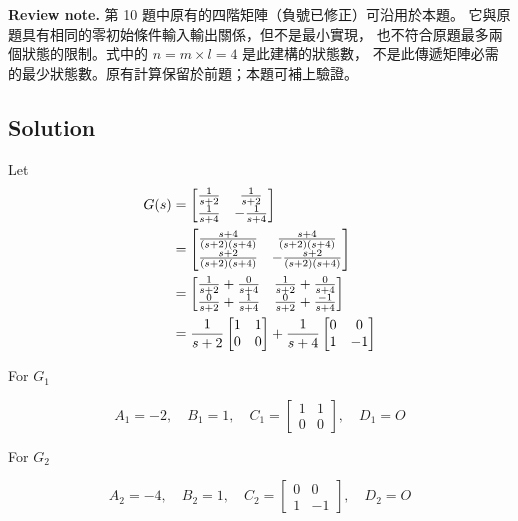 \documentclass[12pt,a4paper]{article}
\begin{document}
\textbf{Review note.} 第 10 題中原有的四階矩陣（負號已修正）可沿用於本題。
它與原題具有相同的零初始條件輸入輸出關係，但不是最小實現，
也不符合原題最多兩個狀態的限制。式中的 $n=m\times l=4$ 是此建構的狀態數，
不是此傳遞矩陣必需的最少狀態數。原有計算保留於前題；本題可補上驗證。

\subsection*{Solution}

Let 
\begin{align*}
	G(s) &= \begin{bmatrix}
		{1\over s+ 2} & {1\over s+ 2} \\
		{1\over s+4} & -{1\over s+4}
	\end{bmatrix} \\
	&= \begin{bmatrix}
		{s + 4 \over (s +2)(s + 4)} & {s + 4 \over (s +2)(s + 4)}  \\
		{s + 2 \over (s +2)(s + 4)} & -{s + 2 \over (s +2)(s + 4)} 
	\end{bmatrix} \\ 
	&= \begin{bmatrix}
		{ 1 \over s + 2} + { 0 \over s + 4} & {1\over s + 2} + {0\over s + 4} \\
		{0 \over s + 2} + {1 \over s + 4} & {0 \over s + 2} + {-1 \over s + 4}
	\end{bmatrix} \\
	&= {1\over s + 2} \begin{bmatrix}
		1 & 1 \\ 0 & 0
	\end{bmatrix} + {1\over s + 4} \begin{bmatrix}
	0 &  0 \\ 1 & -1 
\end{bmatrix}
\end{align*}

For $G_1$

\[
A_1 = -2, \quad B_1 =1, \quad C_1 = \begin{bmatrix}
1 & 1 \\ 0 & 0
\end{bmatrix}, \quad D_1 = O
\]

For $G_2$

\[
A_2=-4, \quad B_2 = 1, \quad C_2 = \begin{bmatrix}
0 & 0 \\ 1 & -1
\end{bmatrix}, \quad D_2 = O
\]
\end{document}
